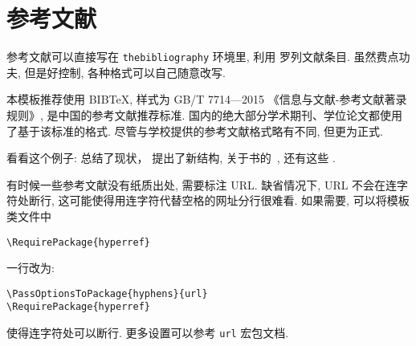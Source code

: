 \chapter{参考文献}
\label{cha:bib}
参考文献可以直接写在 \texttt{thebibliography} 环境里, 利用  罗列文献条目.
虽然费点功夫, 但是好控制, 各种格式可以自己随意改写.

本模板推荐使用 BIB\TeX, 样式为 GB/T 7714—2015 《信息与文献-参考文献著录规则》, 是中国的参考文献推荐标准.
国内的绝大部分学术期刊、学位论文都使用了基于该标准的格式.
尽管与学校提供的参考文献格式略有不同, 但更为正式.

看看这个例子: \citet{drl_2018} 总结了现状，\citet{narasimhan_language_2015} 提出了新结构, 
关于书的~\cite{tex1989,algebra2000}, 还有这些 \cite{narasimhan_language_2015,
drl_2018,nikiforov2014,BuFanZhou2016:Z-eigenvalues,HuQiShao2013:Cored-Hypergraphs,
KangNikiforov2014:Extremal-Problems,LinZhou2016:Distance-Spectral,
LuMan2016:Small-Spectral-Radius,Nikiforov2017:Symmetric-Spectrum,Qi2014:H-Plus-Eigenvalues}.

有时候一些参考文献没有纸质出处, 需要标注 URL.
缺省情况下, URL 不会在连字符处断行, 这可能使得用连字符代替空格的网址分行很难看.
如果需要, 可以将模板类文件中
\begin{verbatim}
\RequirePackage{hyperref}
\end{verbatim}
一行改为:
\begin{verbatim}
\PassOptionsToPackage{hyphens}{url}
\RequirePackage{hyperref}
\end{verbatim}
使得连字符处可以断行. 更多设置可以参考 \texttt{url} 宏包文档.